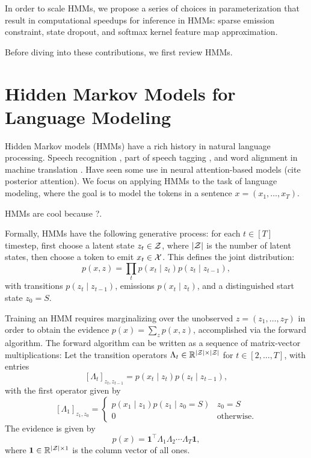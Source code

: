 \documentclass{article}
\begin{document}
In order to scale HMMs, we propose a series of choices in parameterization
that result in computational speedups for inference in HMMs:
sparse emission constraint, state dropout, and softmax kernel feature map approximation.

Before diving into these contributions, we first review HMMs.

\section{Hidden Markov Models for Language Modeling}
Hidden Markov models (HMMs) have a rich history in natural language processing.
Speech recognition \citep{rabiner1990tut},
part of speech tagging \citep{merialdo1994tagging}, 
and word alignment in machine translation \citep{vogel1996hmm}.
Have seen some use in neural attention-based models (cite posterior attention).
We focus on applying HMMs to the task of language modeling,
where the goal is to model the tokens in a sentence $x = (x_1,\ldots,x_T)$.

HMMs are cool because ?.

Formally, HMMs have the following generative process:
for each $t \in [T]$ timestep, first choose a latent state $z_t \in \mathcal{Z}$,
where $|\mathcal{Z}|$ is the number of latent states,
then choose a token to emit $x_t \in \mathcal{X}$.
This defines the joint distribution:
\begin{equation}
p(x,z) = \prod_t p(x_t\mid z_t) p(z_t \mid z_{t-1}),
\end{equation}
with transitions $p(z_t \mid z_{t-1})$, emissions $p(x_t \mid z_t)$,
and a distinguished start state $z_0 = S$.

Training an HMM requires marginalizing over the unobserved
$z = (z_1,\ldots,z_T)$ in order to obtain the evidence $p(x) = \sum_z p(x,z)$,
accomplished via the forward algorithm.
The forward algorithm can be written as a sequence of matrix-vector multiplications:
Let the transition operators $\Lambda_t\in\mathbb{R}^{|\mathcal{Z}|\times|\mathcal{Z}|}$ for $t\in[2,\ldots,T]$, 
with entries $$[\Lambda_t]_{z_t,z_{t-1}} = p(x_t\mid z_t)p(z_t\mid z_{t-1}),$$
with the first operator given by
$$[\Lambda_1]_{z_1,z_0} = \begin{cases}
p(x_1 \mid z_1) p(z_1 \mid z_0=S) & z_0 = S\\
0 & \textrm{otherwise}.
\end{cases}
$$
The evidence is given by
\begin{equation}
p(x) = \mathbf{1}^\top\Lambda_1\Lambda_2\cdots\Lambda_T\mathbf{1},
\end{equation}
where $\mathbf{1}\in\mathbb{R}^{|\mathcal{Z}|\times1}$ is the column vector of all ones.
\end{document}
